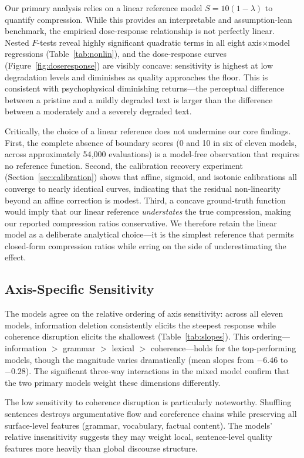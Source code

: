 \documentclass[11pt]{article}
\begin{document}
Our primary analysis relies on a linear reference model $S = 10(1 - \lambda)$ to quantify compression. While this provides an interpretable and assumption-lean benchmark, the empirical dose-response relationship is not perfectly linear. Nested $F$-tests reveal highly significant quadratic terms in all eight axis$\times$model regressions (Table~\ref{tab:nonlin}), and the dose-response curves (Figure~\ref{fig:doseresponse}) are visibly concave: sensitivity is highest at low degradation levels and diminishes as quality approaches the floor. This is consistent with psychophysical diminishing returns---the perceptual difference between a pristine and a mildly degraded text is larger than the difference between a moderately and a severely degraded text.

Critically, the choice of a linear reference does not undermine our core findings. First, the complete absence of boundary scores (0 and 10 in six of eleven models, across approximately 54{,}000 evaluations) is a model-free observation that requires no reference function. Second, the calibration recovery experiment (Section~\ref{sec:calibration}) shows that affine, sigmoid, and isotonic calibrations all converge to nearly identical curves, indicating that the residual non-linearity beyond an affine correction is modest. Third, a concave ground-truth function would imply that our linear reference \emph{understates} the true compression, making our reported compression ratios conservative. We therefore retain the linear model as a deliberate analytical choice---it is the simplest reference that permits closed-form compression ratios while erring on the side of underestimating the effect.

\subsection{Axis-Specific Sensitivity}

The models agree on the relative ordering of axis sensitivity: across all eleven models, information deletion consistently elicits the steepest response while coherence disruption elicits the shallowest (Table~\ref{tab:slopes}). This ordering---information $>$ grammar $>$ lexical $>$ coherence---holds for the top-performing models, though the magnitude varies dramatically (mean slopes from $-6.46$ to $-0.28$). The significant three-way interactions in the mixed model confirm that the two primary models weight these dimensions differently.

The low sensitivity to coherence disruption is particularly noteworthy. Shuffling sentences destroys argumentative flow and coreference chains while preserving all surface-level features (grammar, vocabulary, factual content). The models' relative insensitivity suggests they may weight local, sentence-level quality features more heavily than global discourse structure.
\end{document}
